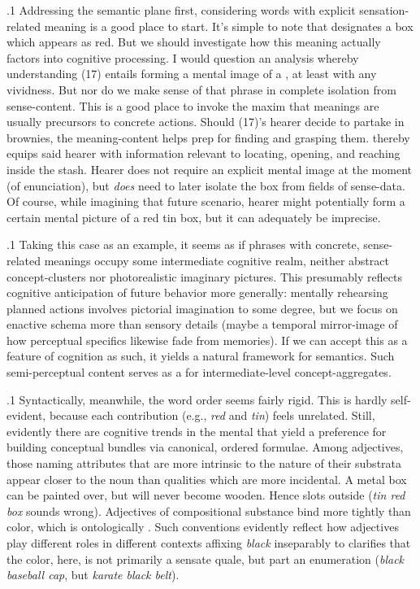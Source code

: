 \documentclass[11pt, twocolumn]{article}
\begin{document}
\p.1{%
\:\+Addressing the semantic plane first, considering words with
explicit sensation-related meaning is a good place to 
start. \> It's simple to note that  designates a box which
appears as red. \> But we should investigate how this
meaning actually factors into cognitive processing. \> I would
question an analysis whereby understanding \exsRef(17) entails forming a
mental image of a , at least with any
vividness. \> But nor do we make sense of that phrase in
complete isolation from sense-content. \> This is a good
place to invoke the maxim that meanings are usually precursors
to concrete actions. \> Should \exsRef(17)'s hearer decide to partake in
brownies, the meaning-content helps prep for finding and grasping them.
 thereby equips said hearer with
information relevant to locating, opening, and reaching inside the 
stash. \> Hearer does not require an explicit mental image at the moment
(of enunciation), but \textit{does} need to later isolate the box from
fields of sense-data. \> Of course, while imagining that future scenario,
hearer might potentially form a certain mental picture of a red tin box,
but it can adequately be imprecise.\<\;
} %

\p.1{%
\:\+Taking this case as an example, it seems as if phrases
with concrete, sense-related meanings occupy some intermediate
cognitive realm, neither abstract concept-clusters nor
photorealistic imaginary pictures. \> This presumably reflects
cognitive anticipation of future behavior more generally: mentally
rehearsing planned actions involves pictorial imagination to
some degree, but we focus on enactive schema more than sensory
details (maybe a temporal mirror-image of how perceptual
specifics likewise fade from 
memories). \> If we can accept this as 
a feature of cognition as such, it yields a
natural framework for semantics. \> Such semi-perceptual content
serves as a  for intermediate-level 
concept-aggregates.\<\;
} %

\p.1{%
\:\+Syntactically, meanwhile, the word order seems fairly 
rigid. \> This
is hardly self-evident, because each contribution
(e.g., \textit{red} and \textit{tin}) feels unrelated. \> Still,
evidently there are cognitive trends in the mental
 that yield a preference for
building conceptual bundles via canonical, ordered
formulae. \> Among adjectives, those naming attributes that are
more intrinsic to the nature of their substrata appear
closer to the noun than qualities which are more
incidental. \> A metal box can be painted over, but will
never become wooden. \> Hence  slots
outside  (\textit{tin red box} sounds wrong). \> Adjectives 
of compositional substance bind more
tightly than color, which is ontologically 
. \> Such conventions evidently reflect
how adjectives play different roles in different
contexts \mdash{} affixing \textit{black} inseparably to
 clarifies that the color, here, is not
primarily a sensate quale, but part
an enumeration (\textit{black baseball cap}, but
\textit{karate black belt}).\<\;
} %
\end{document}
